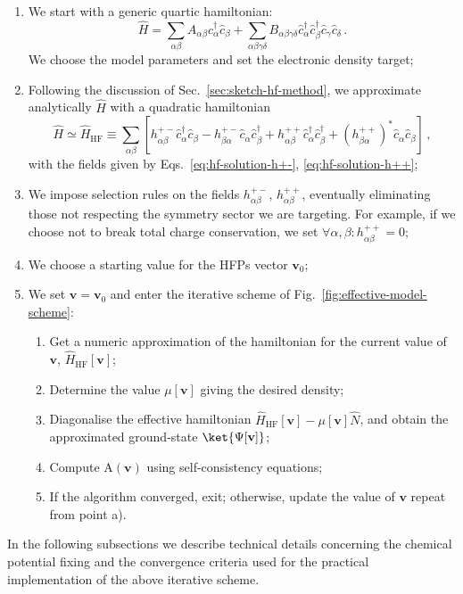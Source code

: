\begin{enumerate}
	\item We start with a generic quartic hamiltonian:
	\[
		\hat H = \sum_{\alpha\beta} A_{\alpha\beta} \hat c_\alpha^\dagger \hat c_\beta + \sum_{\alpha\beta\gamma\delta} B_{\alpha\beta\gamma\delta} \hat c_\alpha^\dagger \hat c_\beta^\dagger \hat c_\gamma \hat c_\delta \, .
	\]
	We choose the model parameters and set the electronic density target;
	\item Following the discussion of Sec.~\ref{sec:sketch-hf-method}, we approximate analytically $\hat H$ with a quadratic hamiltonian
	\[
		\hat H \simeq \hat H_\mathrm{HF} \equiv \sum_{\alpha\beta} \left[
			h_{\alpha\beta}^{+-} \hat c_\alpha^\dagger \hat c_\beta - h_{\beta\alpha}^{+-} \hat c_\alpha \hat c_\beta^\dagger + 			h_{\alpha\beta}^{++} \hat c_\alpha^\dagger \hat c_\beta^\dagger + \left(h_{\beta\alpha}^{++}\right)^* \hat c_\alpha \hat c_\beta
		\right] \, ,
	\]
	with the fields given by Eqs.~\eqref{eq:hf-solution-h+-}, \eqref{eq:hf-solution-h++};
	\item We impose selection rules on the fields $h_{\alpha\beta}^{+-}$, $h_{\alpha\beta}^{++}$, eventually eliminating those not respecting the symmetry sector we are targeting. For example, if we choose not to break total charge conservation, we set $\forall\alpha,\beta \colon h_{\alpha\beta}^{++}=0$;
	\item We choose a starting value for the HFPs vector $\mathbf{v}_0$;
	\item We set $\mathbf{v} = \mathbf{v}_0$ and enter the iterative scheme of Fig.~\ref{fig:effective-model-scheme}:
	\begin{enumerate}
		\item Get a numeric approximation of the hamiltonian for the current value of $\mathbf{v}$, $\hat H_\mathrm{HF}[\mathbf{v}]$;
		\item Determine the value $\mu [\mathbf{v}]$ giving the desired density;
		\item Diagonalise the effective hamiltonian $\hat H_\mathrm{HF} [\mathbf{v}] - \mu[\mathbf{v}] \hat N$, and obtain the approximated ground-state $\ket{\Psi [\mathbf{v}]}$;
		\item Compute $\mathrm{A}(\mathbf{v})$ using self-consistency equations;
		\item If the algorithm converged, exit; otherwise, update the value of $\mathbf{v}$ repeat from point a).
	\end{enumerate}
\end{enumerate}
In the following subsections we describe technical details concerning the chemical potential fixing and the convergence criteria used for the practical implementation of the above iterative scheme.

